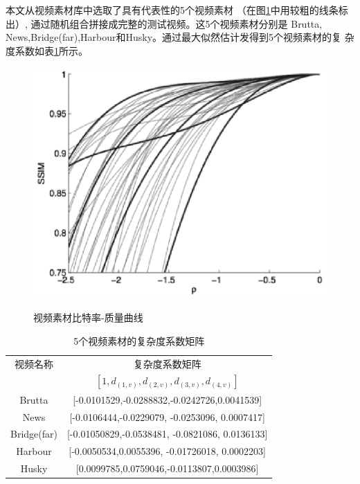 \documentclass[twocolumn]{article}
\renewcommand\arraystretch{1.2}
\begin{document}
本文从视频素材库中选取了具有代表性的5个视频素材
（在图\ref{Video material bit rate-quality curve}中用较粗的线条标出）,
通过随机组合拼接成完整的测试视频。这5个视频素材分别是 Brutta,
News,Bridge(far),Harbour和Husky。通过最大似然估计发得到5个视频素材的复
杂度系数如表\ref{complexity coefficient matrix}所示。
\begin{figure}[htb]
\centering
\includegraphics[width=0.8\columnwidth]{complexity}
\caption{视频素材比特率-质量曲线}
\cite{RN19}
\label{Video material bit rate-quality curve}
\end{figure}
\begin{table}[htbp]
\renewcommand\arraystretch{0.8}
\centering
\caption{5个视频素材的复杂度系数矩阵}
\label{complexity coefficient matrix}
\begin{tabular}{cc}
\toprule 
视频名称&复杂度系数矩阵\\
&$\left[1,d_{(1,v)},d_{(2,v)},d_{(3,v)},d_{(4,v)}\right]$\\
\midrule
Brutta&[-0.0101529,-0.0288832,-0.0242726,0.0041539]\\
News&[-0.0106444,-0.0229079, -0.0253096, 0.0007417]\\
Bridge(far)&[-0.01050829,-0.0538481, -0.0821086, 0.0136133]\\
Harbour&[-0.0050534,0.0055396, -0.01726018, 0.0002203]\\
Husky&[0.0099785,0.0759046,-0.0113807,0.0003986]\\
\bottomrule 
\end{tabular}
\end{table}
\end{document}
